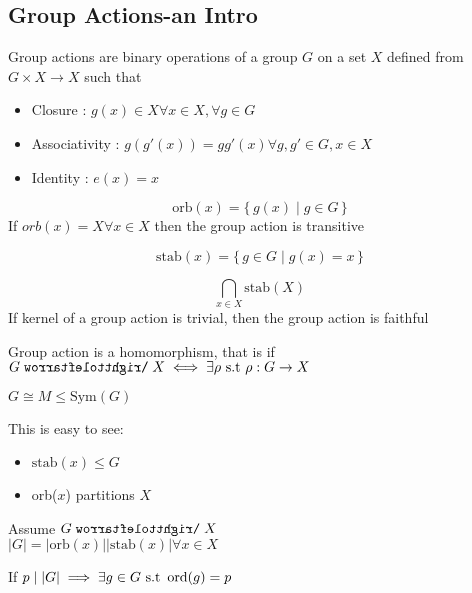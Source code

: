 \documentclass[11pt]{scrartcl}
\newcommand\Set[2]{\{\,#1\mid#2\,\}}
\def\acts{\mathrel{\reflectbox{$\righttoleftarrow$}}}
\begin{document}
\subsection{Group Actions-an Intro}
\begin{definitions}
Group actions are binary operations of a group $G$ on a set $X$ defined from $G \times X \to X$ such that 
\begin{itemize}
    \item Closure : $g(x) \in X \forall x \in X, \forall g \in G$
    \item Associativity : $g(g'(x))=gg'(x) \forall g,g' \in G, x \in X$
    \item Identity : $e(x)=x$
\end{itemize}
\end{definitions}
\begin{definitions}
$$\text{orb}(x)=\Set{g(x)}{g \in G}$$
If $orb(x)=X \forall x \in X$ then the group action is transitive
\end{definitions}
\begin{definitions}
$$\text{stab}(x) = \Set{g\in G}{g(x)=x}$$
\end{definitions}
\begin{definitions}
$$\bigcap_{x \in X} \text{stab}(X)$$
If kernel of a group action is trivial, then the group action is faithful
\end{definitions}
\begin{prop}
Group action is a homomorphism, that is if $G \acts X \iff \exists \rho \text{ s.t } \rho : G \rightarrow X$
\end{prop}
\begin{theorem}
$G \cong M \leq \text{Sym}(G)$
\end{theorem}
\begin{prop}
This is easy to see:
\begin{itemize}
    \item $\text{stab}(x) \leq G $
    \item orb($x$) partitions $X$
\end{itemize}
\end{prop}
\begin{theorem}
Assume $G \acts X$ \\
$\vert G \vert = \vert \text{orb}(x) \vert \vert \text{stab}(x) \vert \forall x\in X$
\end{theorem}
\begin{theorem}
If $p \mid \vert G \vert \implies \exists g \in G \text{ s.t } \operatorname{ord}(g) = p$
\end{theorem}
\end{document}
